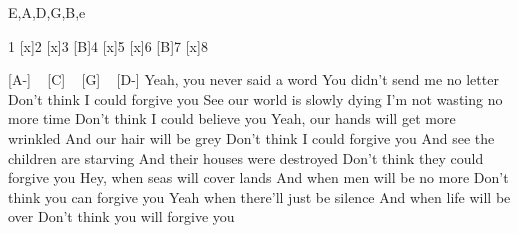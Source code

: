 \begin{tabline}{4}{4}{4}{E,A,D,G,B,e}
\nextbar

\nextbar

\nextbar

\nextbar
\end{tabline}

\begin{guitar}
[B]1 [x]2 [x]3 [B]4 [x]5 [x]6 [B]7 [x]8

[A-] ~ [C] ~ [G] ~ [D-]
Yeah, you never said a word
You didn't send me no letter
Don't think I could forgive you
See our world is slowly dying
I'm not wasting no more time
Don't think I could believe you
Yeah, our hands will get more wrinkled
And our hair will be grey
Don't think I could forgive you
And see the children are starving
And their houses were destroyed
Don't think they could forgive you
Hey, when seas will cover lands
And when men will be no more
Don't think you can forgive you
Yeah when there'll just be silence
And when life will be over
Don't think you will forgive you
\end{guitar}